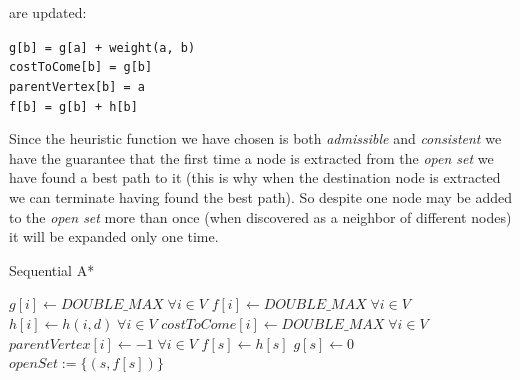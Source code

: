 \documentclass[twocolumn, switch]{article} %
\begin{document}
are updated: 
\begin{flushleft}
  \texttt{g[b] = g[a] + weight(a, b)}\\
  \texttt{costToCome[b] = g[b]}\\
  \texttt{parentVertex[b] = a}\\
  \texttt{f[b] = g[b] + h[b]}
\end{flushleft}
Since the heuristic function we have chosen is both \textit{admissible} and \textit{consistent} we have the guarantee 
that the first time a node is extracted from the \textit{open set} we have found a best path to it (this
is why when the destination node is extracted we can terminate having found the best path). So despite
one node may be added to the \textit{open set} more than once (when discovered as a neighbor of different nodes)
it will be expanded only one time.
\begin{algorithm}[ht!] 
\caption{Sequential A*}\label{alg:two}
$g[i] \gets DOUBLE\_MAX \;\forall i \in V$\;
$f[i] \gets DOUBLE\_MAX \;\forall i \in V$\;
$h[i] \gets h(i, d) \; \forall i \in V$\;
$costToCome[i] \gets DOUBLE\_MAX \; \forall i \in V$\;
$parentVertex[i] \gets -1 \; \forall i \in V$\;
$f[s] \gets h[s]$\;
$g[s] \gets 0$\;
$openSet := \{(s, f[s])\}$\;
\end{algorithm}
\end{document}
